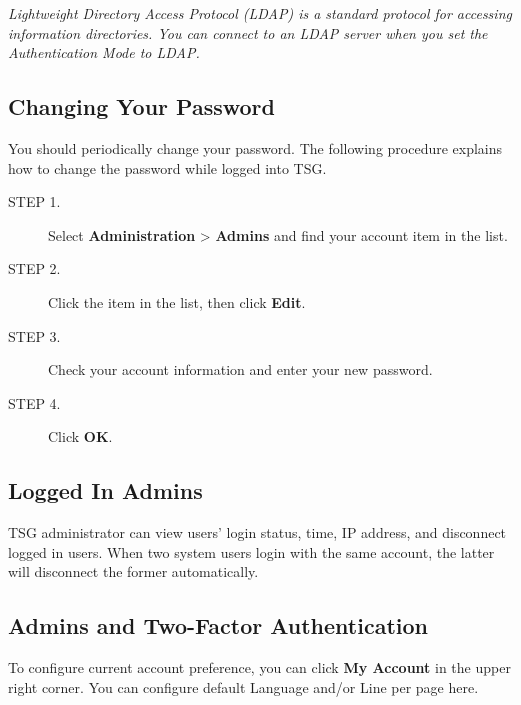 \notemark\textit{Lightweight Directory Access Protocol (LDAP) is a standard protocol for accessing information directories. 
You can connect to an LDAP server when you set the Authentication Mode to LDAP.}

\subsection*{\hypertarget{link:Changing Your Password}{Changing Your Password}}
\label{sec:intro:logging:password}

You should periodically change your password. The following procedure explains how to change the password while logged into TSG.


\begin{description}
    \item[STEP 1.]Select \textbf{Administration} > \textbf{Admins} and find your account item in the list.
    \item[STEP 2.]Click the item in the list, then click \textbf{Edit}.
    \item[STEP 3.]Check your account information and enter your new password.
    \item[STEP 4.]Click \textbf{OK}.\\
\end{description}

\subsection*{\hypertarget{link:Logged In Admins}{Logged In Admins}}
\label{sec:intro:logging:Logged}

TSG administrator can view users’ login status, time, IP address, and disconnect logged in users. When two system users login with the same account, 
the latter will disconnect the former automatically.    

\subsection*{\hypertarget{link:Admins and Two-Factor Authentication}{Admins and Two-Factor Authentication}}
\label{sec:intro:logging:2fa}
 
To configure current account preference, you can click \textbf{My Account} in the upper right corner. You can configure default Language and/or Line per page here. 


